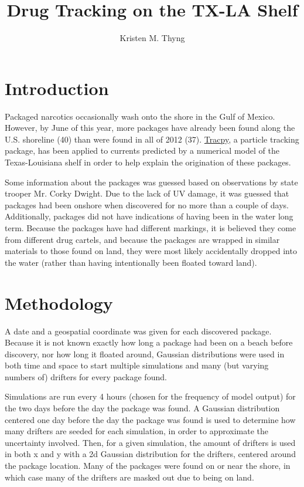 \documentclass[11pt]{article}
\title{Drug Tracking on the TX-LA Shelf}
\author{Kristen M. Thyng}
\begin{document}
\maketitle

\section{Introduction}

Packaged narcotics occasionally wash onto the shore in the Gulf of Mexico. However, by June of this year, more packages have already been found along the U.S. shoreline (40) than were found in all of 2012 (37). \href{http://www.github.com/kthyng/tracpy}{Tracpy}, a particle tracking package, has been applied to currents predicted by a numerical model of the Texas-Louisiana shelf in order to help explain the origination of these packages.

Some information about the packages was guessed based on observations by state trooper Mr. Corky Dwight. Due to the lack of UV damage, it was guessed that packages had been onshore when discovered for no more than a couple of days. Additionally, packages did not have indications of having been in the water long term. Because the packages have had different markings, it is believed they come from different drug cartels, and because the packages are wrapped in similar materials to those found on land, they were most likely accidentally dropped into the water (rather than having intentionally been floated toward land).

\section{Methodology}

A date and a geospatial coordinate was given for each discovered package. Because it is not known exactly how long a package had been on a beach before discovery, nor how long it floated around, Gaussian distributions were used in both time and space to start multiple simulations and many (but varying numbers of) drifters for every package found. 

Simulations are run every 4 hours (chosen for the frequency of model output) for the two days before the day the package was found. A Gaussian distribution centered one day before the day the package was found is used to determine how many drifters are seeded for each simulation, in order to approximate the uncertainty involved. Then, for a given simulation, the amount of drifters is used in both x and y with a 2d Gaussian distribution for the drifters, centered around the package location. Many of the packages were found on or near the shore, in which case many of the drifters are masked out due to being on land.
\end{document}
